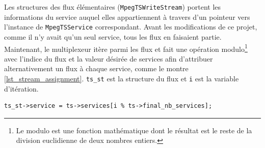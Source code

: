 \documentclass[12pt,a4paper]{article}
\begin{document}

Les structures des flux élémentaires (\texttt{MpegTSWriteStream}) portent les informations du service auquel elles appartiennent à travers d'un pointeur vers l'instance de \texttt{MpegTSService} correspondant. Avant les modifications de ce projet, comme il n'y avait qu'un seul service, tous les flux en faisaient partie. Maintenant, le multiplexeur itère parmi les flux et fait une opération modulo\footnote{Le modulo est une fonction mathématique dont le résultat est le reste de la division euclidienne de deux nombres entiers.} avec l'indice du flux et la valeur désirée de services afin d'attribuer alternativement un flux à chaque service, comme le montre \autoref{lst_stream_assignment}. \texttt{ts\hspace{0.1mm}\_\hspace{0.1mm}st} est la structure du flux et \texttt{i} est la variable d'itération.

\begin{minipage}{\linewidth}
\begin{lstlisting}[caption={Attribution des flux aux services.}, label={lst_stream_assignment}]
ts_st->service = ts->services[i % ts->final_nb_services];
\end{lstlisting}
\end{minipage}

\end{document}
